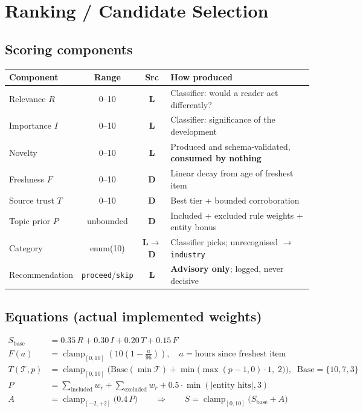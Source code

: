 \documentclass[10pt,a4paper]{article}
\newcommand{\cd}[1]{\texttt{\footnotesize\hyphenpenalty=0\exhyphenpenalty=0\relax #1}}
\newcommand{\D}{\textcolor{go}{\textbf{D}}}
\newcommand{\Lm}{\textcolor{ac}{\textbf{L}}}
\newcommand{\LD}{\textcolor{hd}{\textbf{L$\rightarrow$D}}}
\begin{document}
\section{Ranking / Candidate Selection}

\subsection{Scoring components}

\begin{center}\footnotesize
\begin{tabularx}{\textwidth}{@{}l c c >{\RaggedRight}X@{}}
\toprule
\textbf{Component} & \textbf{Range} & \textbf{Src} & \textbf{How produced} \\
\midrule
Relevance $R$ & 0--10 & \Lm & Classifier: would a reader act differently? \\
Importance $I$ & 0--10 & \Lm & Classifier: significance of the development \\
Novelty & 0--10 & \Lm & Produced and schema-validated, \textbf{consumed by nothing} \\
Freshness $F$ & 0--10 & \D & Linear decay from age of freshest item \\
Source trust $T$ & 0--10 & \D & Best tier + bounded corroboration \\
Topic prior $P$ & unbounded & \D & Included + excluded rule weights + entity bonus \\
Category & enum(10) & \LD & Classifier picks; unrecognised $\rightarrow$ \cd{industry} \\
Recommendation & \cd{proceed}/\cd{skip} & \Lm & \textbf{Advisory only}; logged, never decisive \\
\bottomrule
\end{tabularx}
\end{center}

\subsection{Equations (actual implemented weights)}

\vspace{-0.6em}
\begin{align}
S_{\text{base}} &= 0.35\,R + 0.30\,I + 0.20\,T + 0.15\,F \\[-0.1em]
F(a) &= \operatorname{clamp}_{[0,10]}\!\left(10\left(1-\tfrac{a}{96}\right)\right),
\quad a = \text{hours since freshest item} \\[-0.1em]
T(\mathcal{T},p) &= \operatorname{clamp}_{[0,10]}\!\Big(\mathrm{Base}(\min\mathcal{T}) + \min\big(\max(p-1,0)\cdot 1,\;2\big)\Big),
\;\;\mathrm{Base}=\{10,7,3\} \\[-0.1em]
P &= \textstyle\sum_{\text{included}} w_r + \sum_{\text{excluded}} w_r + 0.5\cdot\min(|\text{entity hits}|,3) \\[-0.1em]
A &= \operatorname{clamp}_{[-2,+2]}\big(0.4\,P\big)
\qquad\Longrightarrow\qquad
S = \operatorname{clamp}_{[0,10]}\big(S_{\text{base}} + A\big)
\end{align}
\end{document}

